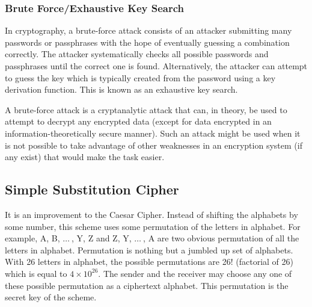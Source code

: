\documentclass[british]{article}
\begin{document}
\subsubsection{Brute Force/Exhaustive Key Search}

In cryptography, a brute-force attack consists of an attacker submitting
many passwords or passphrases with the hope of eventually guessing
a combination correctly. The attacker systematically checks all possible
passwords and passphrases until the correct one is found. Alternatively,
the attacker can attempt to guess the key which is typically created
from the password using a key derivation function. This is known as
an exhaustive key search.

A brute-force attack is a cryptanalytic attack that can, in theory,
be used to attempt to decrypt any encrypted data (except for data
encrypted in an information-theoretically secure manner). Such an
attack might be used when it is not possible to take advantage of
other weaknesses in an encryption system (if any exist) that would
make the task easier.

\pagebreak{}

\subsection{Simple Substitution Cipher}

It is an improvement to the Caesar Cipher. Instead of shifting the
alphabets by some number, this scheme uses some permutation of the
letters in alphabet. For example, A, B, $\ldots\:$, Y, Z and Z, Y,
$\ldots\:$, A are two obvious permutation of all the letters in alphabet.
Permutation is nothing but a jumbled up set of alphabets. With 26
letters in alphabet, the possible permutations are 26! (factorial
of 26) which is equal to $4\times10^{26}$. The sender and the receiver
may choose any one of these possible permutation as a ciphertext alphabet.
This permutation is the secret key of the scheme.
\end{document}
